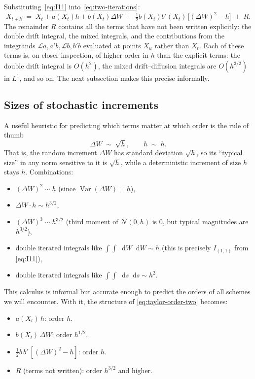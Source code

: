 \documentclass[11pt,a4paper]{article}
\theoremstyle{plain}
\theoremstyle{definition}
\theoremstyle{remark}
\newcommand{\Var}{\operatorname{Var}}
\newcommand{\dd}{\mathop{}\!\mathrm{d}}
\newcommand{\Lop}{\mathcal{L}}
\begin{document}
Substituting~\eqref{eq:I11} into~\eqref{eq:two-iterations}:
\begin{equation}
\label{eq:taylor-order-two}
X_{t+h} \;=\; X_t + a(X_t) h + b(X_t) \Delta W
\;+\; \tfrac{1}{2} b(X_t) b'(X_t)\, \big[(\Delta W)^2 - h\big]
\;+\; R.
\end{equation}
The remainder $R$ contains all the terms that have not been written
explicitly: the double drift integral, the mixed integrals, and the
contributions from the integrands $\Lop a, a' b, \Lop b, b' b$
evaluated at points $X_u$ rather than $X_t$. Each of these terms is,
on closer inspection, of higher order in $h$ than the explicit terms:
the double drift integral is $O(h^2)$, the mixed drift--diffusion
integrals are $O(h^{3/2})$ in $L^1$, and so on. The next subsection
makes this precise informally.

\subsection{Sizes of stochastic increments}
\label{sec:sizes}

A useful heuristic for predicting which terms matter at which order is
the rule of thumb
\begin{equation}
\Delta W \;\sim\; \sqrt{h},
\qquad h \;\sim\; h.
\end{equation}
That is, the random increment $\Delta W$ has standard deviation
$\sqrt{h}$, so its ``typical size'' in any norm sensitive to it is
$\sqrt{h}$, while a deterministic increment of size $h$ stays $h$.
Combinations:
\begin{itemize}
\item $(\Delta W)^2 \sim h$ (since $\Var(\Delta W) = h$),
\item $\Delta W \cdot h \sim h^{3/2}$,
\item $(\Delta W)^3 \sim h^{3/2}$ (third moment of $\mathcal{N}(0, h)$
is $0$, but typical magnitudes are $h^{3/2}$),
\item double iterated integrals like
$\int\!\int \dd W \dd W \sim h$ (this is precisely $I_{(1,1)}$ from
\eqref{eq:I11}),
\item double iterated integrals like $\int\!\int \dd s \dd s \sim h^2$.
\end{itemize}

This calculus is informal but accurate enough to predict the orders
of all schemes we will encounter. With it, the structure of
\eqref{eq:taylor-order-two} becomes:
\begin{itemize}
\item $a(X_t)\, h$: order $h$.
\item $b(X_t)\, \Delta W$: order $h^{1/2}$.
\item $\tfrac{1}{2} b\, b'\, [(\Delta W)^2 - h]$: order $h$.
\item $R$ (terms not written): order $h^{3/2}$ and higher.
\end{itemize}
\end{document}
